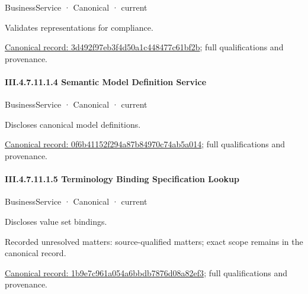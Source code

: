 \label{element:3d492f97eb3f4d50a1c448477c61bf2b}
{\small BusinessService · Canonical · current}\par

Validates representations for compliance.


{\footnotesize \href{../../../../../../../continuum/business/business-service/3d492f97eb3f4d50a1c448477c61bf2b.md}{Canonical record: 3d492f97eb3f4d50a1c448477c61bf2b}; full qualifications and provenance.}\par
\paragraph*{III.4.7.11.1.4 Semantic Model Definition Service}
\label{navigation:III.4.7.11.1.4}

\label{element:0f6b41152f294a87b84970c74ab5a014}
{\small BusinessService · Canonical · current}\par

Discloses canonical model definitions.


{\footnotesize \href{../../../../../../../continuum/business/business-service/0f6b41152f294a87b84970c74ab5a014.md}{Canonical record: 0f6b41152f294a87b84970c74ab5a014}; full qualifications and provenance.}\par
\paragraph*{III.4.7.11.1.5 Terminology Binding Specification Lookup}
\label{navigation:III.4.7.11.1.5}

\label{element:1b9e7c961a054a6bbdb7876d08a82ef3}
{\small BusinessService · Canonical · current}\par

Discloses value set bindings.


{\small Recorded unresolved matters: source-qualified matters; exact scope remains in the canonical record.}\par
{\footnotesize \href{../../../../../../../continuum/business/business-service/1b9e7c961a054a6bbdb7876d08a82ef3.md}{Canonical record: 1b9e7c961a054a6bbdb7876d08a82ef3}; full qualifications and provenance.}\par
